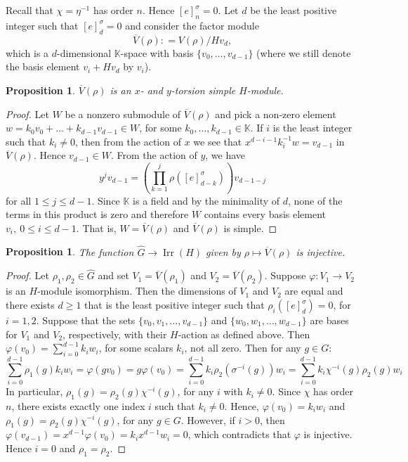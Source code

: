\documentclass[11pt, twoside]{amsart}
\newtheorem{proposition}[theorem]{Proposition}
\theoremstyle{definition}
\newcommand{\KK}{\mathbb{K}}
\newcommand{\Irr}{\operatorname{Irr}}
\newcommand{\wind}[2]{[#1]_{#2}^{\sigma}}
\begin{document}
Recall that $\chi=\eta^{-1}$ has order $n$. Hence $\wind{e}{n}=0$. Let $d$ be the least positive integer such that $\wind{e}{d}=0$ and consider the factor module 
%
\[ \overline{V}(\rho): = V(\rho)/Hv_d, \]
%
 which is a $d$-dimensional $\KK$-space with basis $\{v_0, \ldots, v_{d-1}\}$ (where we still denote the basis element $v_i + Hv_d$ by $v_i$). 
%
\begin{proposition}
$\overline{V}(\rho)$ is  an $x$- and $y$-torsion simple  $H$-module.
\end{proposition}
%
\begin{proof}
Let $W$ be a nonzero submodule of $\overline{V}(\rho)$ and pick a  non-zero element $w = k_0 v_0 + \ldots + k_{d-1}v_{d-1} \in W$,  for some $k_0, \ldots, k_{d-1} \in \KK$. If $i$ is the least integer such that $k_i \neq 0$, then from the action of $x$ we see that $x^{d-i-1}k_{i}^{-1}w = v_{d-1}$ in $\overline{V}(\rho)$. Hence $v_{d-1} \in W$. From the action of $y$, we have
    \[y^j v_{d-1} = \left(\prod_{k=1}^{j}\rho(\wind{e}{d-k}) \right)v_{d-1-j}\]
    for all $1 \leq j \leq d-1$. Since $\KK$ is a field and by the minimality of $d$, none of the terms in this product is zero and therefore $W$ contains every basis element $v_i,\ 0 \leq i \leq d-1$. That is, $W = \overline{V}(\rho)$ and $\overline{V}(\rho)$ is simple. 
\end{proof}
%
\begin{proposition} The function $\widehat{G} \to \Irr(H)$ given by $\rho \mapsto \overline{V}(\rho)$ is injective.
\end{proposition}
\begin{proof}
Let $\rho_1, \rho_2\in \widehat{G}$ and set $V_1=\overline{V}(\rho_1)$ and $V_2=\overline{V}(\rho_2)$.  Suppose  $\varphi: V_1 \to V_2$ is an $H$-module isomorphism. Then the dimensions of $V_1$ and $V_2$ are equal and there exists $d\geq 1$ that is the least positive integer such that $\rho_i(\wind{e}{d})=0$, for $i=1,2$.  Suppose that the sets $\{v_{0}, v_{1}, \ldots, v_{d-1}\}$ and $\{w_{0}, w_{1}, \ldots, w_{d-1}\}$ are bases for $V_{1}$ and $V_{2}$, respectively, with their $H$-action as defined above.    Then $\varphi(v_0) = \sum_{i=0}^{d-1} k_i w_i$, for some scalars $k_i$, not all zero. Then for any $g\in G$:
\begin{equation*}
\sum_{i=0}^{d-1} \rho_1(g) k_i w_i =  \varphi(g v_0) = g \varphi(v_0) = \sum_{i=0}^{d-1} k_i \rho_2(\sigma^{-i}(g)) w_i = \sum_{i=0}^{d-1} k_i \chi^{-i}(g) \rho_2(g) w_i\end{equation*}
In particular, $\rho_1(g) = \rho_2(g)\chi^{-i}(g)$, for any $i$ with $k_i\neq 0$. Since $\chi$ has order $n$, there exists exactly one index $i$ such that $k_i\neq 0$. Hence, $\varphi(v_0)=k_iw_i$ and $\rho_1(g)=\rho_2(g)\chi^{-i}(g)$, for any $g\in G$. However, if $i>0$, then $\varphi(v_{d-1})=x^{d-1} \varphi(v_0) = k_i x^{d-1} w_i = 0$, which contradicts that $\varphi$ is injective. Hence $i=0$ and $\rho_1=\rho_2$. \end{proof}
%
\end{document}
